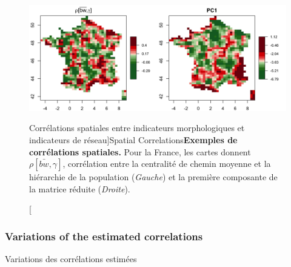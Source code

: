 \begin{figure}[h!]
\includegraphics[width=\linewidth]{Figures/Final/4-1-3-fig-staticcorrs-mapscorrs}
\caption[Spatial Correlations][Corrélations spatiales entre indicateurs morphologiques et indicateurs de réseau]{Spatial Correlations\label{fig:staticcorrs:mapscorrs}}{\textbf{Exemples de corrélations spatiales.} Pour la France, les cartes donnent $\rho\left[\bar{bw},\gamma\right]$, corrélation entre la centralité de chemin moyenne et la hiérarchie de la population (\textit{Gauche}) et la première composante de la matrice réduite (\textit{Droite}).\label{fig:staticcorrs:mapscorrs}}
\end{figure}



\subsubsection{Variations of the estimated correlations}{Variations des corrélations estimées}


